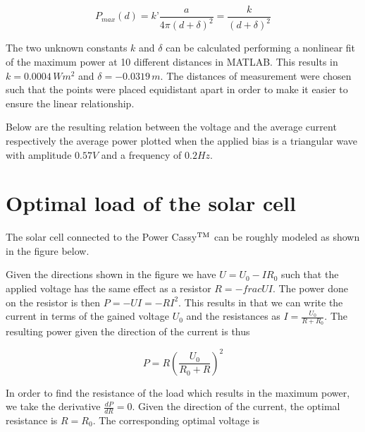 \documentclass[a4paper,twoside=false,abstract=false,numbers=noenddot,
titlepage=false,headings=small,parskip=half,version=last]{scrartcl}
\begin{document}
\begin{equation}
    P_{max}(d) = k’\frac{a}{4\pi(d+\delta)^2} = \frac{k}{(d+\delta)^2}
\end{equation}

The two unknown constants $k$ and $\delta$ can be calculated performing a
nonlinear fit of the maximum power at 10 different distances in MATLAB. This
results in $k = 0.0004\,Wm^{2}$ and $\delta = -0.0319\,m$.
The distances of measurement were chosen such that the points were placed equidistant apart
in order to make it easier to ensure the linear relationship.


Below are the resulting relation between the voltage and the average current respectively the average power plotted when the applied bias is a triangular wave with amplitude $0.57 V$ and a frequency of $0.2 Hz$.




\section{Optimal load of the solar cell}
The solar cell connected to the Power Cassy$\textsuperscript{TM}$ can be roughly modeled as shown in the figure below.


Given the directions shown in the figure we have $U=U_0-IR_0$ such that the applied voltage has the same effect as a resistor $R=-frac{U}{I}$. The power done on the resistor is then $P=-U I=-R I^{2}$. This results in that we can write the current in terms of the gained voltage $U_0$ and the resistances as $I=\frac{U_0}{R + R_0}$. The resulting power given the direction of the current is thus

\begin{equation}
    P = R (\frac{ U_0}{ R_0+R})^{2}
\end{equation}

In order to find the resistance of the load which results in the maximum power, we take the derivative $\frac{d P}{d R} = 0$. Given the direction of the current, the optimal resistance is $R = R_0$. The corresponding optimal voltage is
\end{document}

